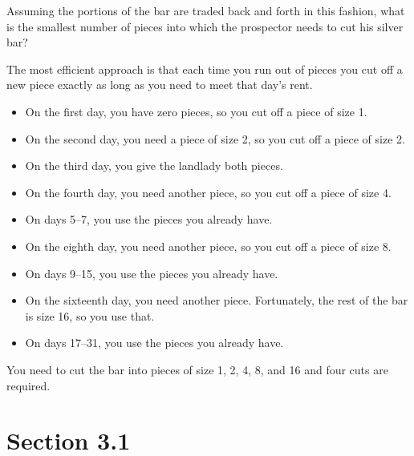 \documentclass[letterpaper, landscape]{exam}
\begin{document}
    Assuming the portions of the bar are traded back and forth in this fashion, what is the smallest number of pieces into
    which the prospector needs to cut his silver bar?

    \begin{solution}

        The most efficient approach is that each time you run out of pieces
        you cut off a new piece exactly as long as you need to meet that
        day's rent.  

        \begin{itemize}
            \item On the first day, you have zero pieces, so you cut off a piece of size 1.  
            \item On the second day, you need a piece of size 2, so you cut off a piece of size 2.
            \item On the third day, you give the landlady both pieces.
            \item On the fourth day, you need another piece, so you cut off a piece of size 4.
            \item On days 5--7, you use the pieces you already have.
            \item On the eighth day, you need another piece, so you cut off a piece of size 8.
            \item On days 9--15, you use the pieces you already have.
            \item On the sixteenth day, you need another piece.  Fortunately, the rest of the bar is size 16, so you use that.
            \item On days 17--31, you use the pieces you already have.
        \end{itemize}

        You need to cut the bar into pieces of size 1, 2, 4, 8, and 16 and four cuts are required.

    \end{solution}
    \ifprintanswers{}

        \section{Section 3.1} 
\end{document}
